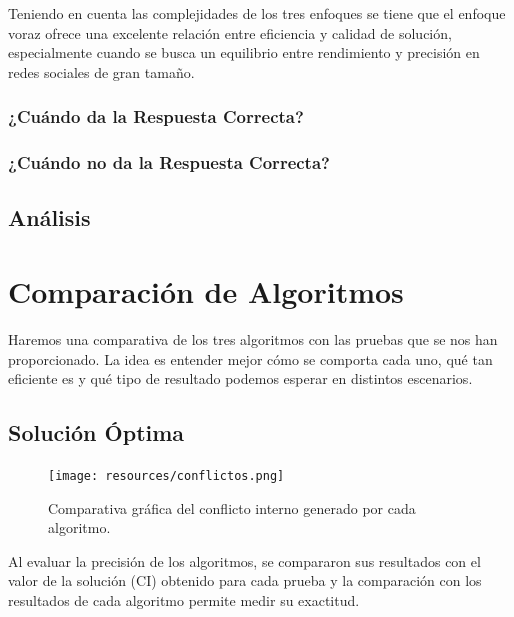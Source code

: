 \documentclass[11pt,letter]{article}
\begin{document}
    Teniendo en cuenta las complejidades de los tres enfoques se tiene que el enfoque voraz ofrece una excelente relación entre eficiencia y calidad de solución, especialmente cuando se busca un equilibrio entre rendimiento y precisión en redes sociales de gran tamaño.

    \subsubsection{¿Cuándo da la Respuesta Correcta?}

    \subsubsection{¿Cuándo no da la Respuesta Correcta?}

    \subsection{Análisis}


    \newpage



    \section{Comparación de Algoritmos}

    Haremos una comparativa de los tres algoritmos con las pruebas que se nos han proporcionado. La idea es entender mejor cómo se comporta cada uno, qué tan eficiente es y qué tipo de resultado podemos esperar en distintos escenarios.

    \subsection{Solución Óptima}

    \begin{figure}[H]
        \centering
        \texttt{[image: resources/conflictos.png]}
        \caption{Comparativa gráfica del conflicto interno generado por cada algoritmo.}
    \end{figure}

    Al evaluar la precisión de los algoritmos, se compararon sus resultados con el valor de la solución (CI) obtenido para cada prueba y la comparación con los resultados de cada algoritmo permite medir su exactitud.
\end{document}
